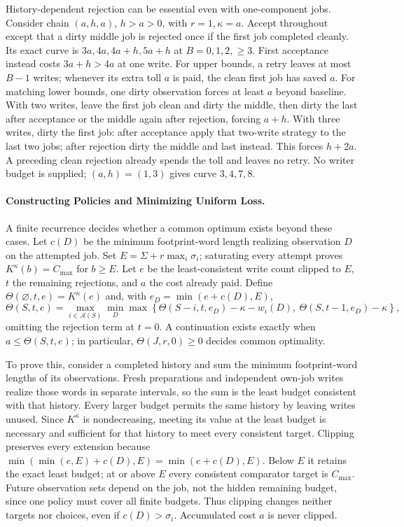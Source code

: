History-dependent rejection can be essential even with one-component jobs. Consider chain $(a,h,a)$, $h>a>0$, with $r=1,\kappa=a$. Accept throughout except that a dirty middle job is rejected once if the first job completed cleanly. Its exact curve is $3a,4a,4a+h,5a+h$ at $B=0,1,2,\ge3$. First acceptance instead costs $3a+h>4a$ at one write. For upper bounds, a retry leaves at most $B-1$ writes; whenever its extra toll $a$ is paid, the clean first job has saved $a$. For matching lower bounds, one dirty observation forces at least $a$ beyond baseline. With two writes, leave the first job clean and dirty the middle, then dirty the last after acceptance or the middle again after rejection, forcing $a+h$. With three writes, dirty the first job: after acceptance apply that two-write strategy to the last two jobs; after rejection dirty the middle and last instead. This forces $h+2a$. A preceding clean rejection already spends the toll and leaves no retry. No writer budget is supplied; $(a,h)=(1,3)$ gives curve $3,4,7,8$.

\paragraph{Constructing Policies and Minimizing Uniform Loss.}
A finite recurrence decides whether a common optimum exists beyond these cases. Let $c(D)$ be the minimum footprint-word length realizing observation $D$ on the attempted job. Set $E=\Sigma+r\max_i\sigma_i$; saturating every attempt proves $K^{\kappa}(b)=C_{\max}$ for $b\ge E$. Let $e$ be the least-consistent write count clipped to $E$, $t$ the remaining rejections, and $a$ the cost already paid. Define $\Theta(\varnothing,t,e)=K^{\kappa}(e)$ and, with $e_D=\min(e+c(D),E)$,
\begin{equation}
\Theta(S,t,e)=\max_{i\in\mathcal A(S)}\min_D
\max\left\{\Theta(S-i,t,e_D)-\kappa-w_i(D),\
\Theta(S,t-1,e_D)-\kappa\right\},
\label{eq:viability}
\end{equation}
omitting the rejection term at $t=0$. A continuation exists exactly when $a\le\Theta(S,t,e)$; in particular, $\Theta(J,r,0)\ge0$ decides common optimality.

To prove this, consider a completed history and sum the minimum footprint-word lengths of its observations. Fresh preparations and independent own-job writes realize those words in separate intervals, so the sum is the least budget consistent with that history. Every larger budget permits the same history by leaving writes unused. Since $K^\kappa$ is nondecreasing, meeting its value at the least budget is necessary and sufficient for that history to meet every consistent target. Clipping preserves every extension because $\min(\min(e,E)+c(D),E)=\min(e+c(D),E)$. Below $E$ it retains the exact least budget; at or above $E$ every consistent comparator target is $C_{\max}$. Future observation sets depend on the job, not the hidden remaining budget, since one policy must cover all finite budgets. Thus clipping changes neither targets nor choices, even if $c(D)>\sigma_i$. Accumulated cost $a$ is never clipped.

